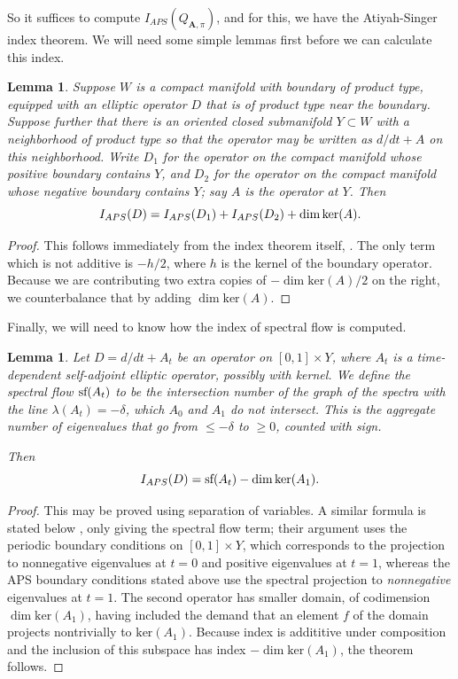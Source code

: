 \documentclass[10pt,a4paper]{amsart}
\newtheorem{lemma}[theorem]{Lemma}
\theoremstyle{definition}
\theoremstyle{remark}
\numberwithin{figure}{qchap}
\begin{document}
So it suffices to compute $I_{APS}(Q_{\mathbf{A},\pi})$, and for this, we have the Atiyah-Singer index theorem. We will need some simple lemmas first before we can calculate this index.

\begin{lemma}\label{APSadd}Suppose $W$ is a compact manifold with boundary of product type, equipped with an elliptic operator $D$ that is of product type near the boundary. Suppose further that there is an oriented closed submanifold $Y \subset W$ with a neighborhood of product type so that the operator may be written as $d/dt + A$ on this neighborhood. Write $D_1$ for the operator on the compact manifold whose positive boundary contains $Y$, and $D_2$ for the operator on the compact manifold whose negative boundary contains $Y$; say $A$ is the operator at $Y$. Then $$I_{APS}(D) = I_{APS}(D_1) + I_{APS}(D_2) + \dim \textup{ker}(A).$$
\end{lemma}
\begin{proof}This follows immediately from the index theorem itself, \cite[Theorem~3.10]{atiyah1975spectral}. The only term which is not additive is $-h/2$, where $h$ is the kernel of the boundary operator. Because we are contributing two extra copies of $-\dim \text{ker}(A)/2$ on the right, we counterbalance that by adding $\dim \text{ker}(A)$.
\end{proof}

Finally, we will need to know how the index of spectral flow is computed.

\begin{lemma}\label{sfindex}Let $D = d/dt + A_t$ be an operator on $[0,1] \times Y$, where $A_t$ is a time-dependent self-adjoint elliptic operator, possibly with kernel. We define the spectral flow $\textup{sf}(A_t)$ to be the intersection number of the graph of the spectra with the line $\lambda(A_t) = -\delta$, which $A_0$ and $A_1$ do not intersect. This is the aggregate number of eigenvalues that go from $\leq - \delta$ to $\geq 0$, counted with sign.

Then 
$$I_{APS}(D) = \textup{sf}(A_t) - \dim \textup{ker}(A_1).$$
\end{lemma}
\begin{proof}This may be proved using separation of variables. A similar formula is stated below \cite[Theorem~7.4]{atiyah1996spectral}, only giving the spectral flow term; their argument uses the periodic boundary conditions on $[0,1] \times Y$, which corresponds to the projection to nonnegative eigenvalues at $t = 0$ and positive eigenvalues at $t = 1$, whereas the APS boundary conditions stated above use the spectral projection to \emph{nonnegative} eigenvalues at $t=1$. The second operator has smaller domain, of codimension $\dim \text{ker}(A_1)$, having included the demand that an element $f$ of the domain projects nontrivially to $\text{ker}(A_1)$. Because index is addititive under composition and the inclusion of this subspace has index $-\dim\text{ker}(A_1)$, the theorem follows.
\end{proof}
\end{document}
